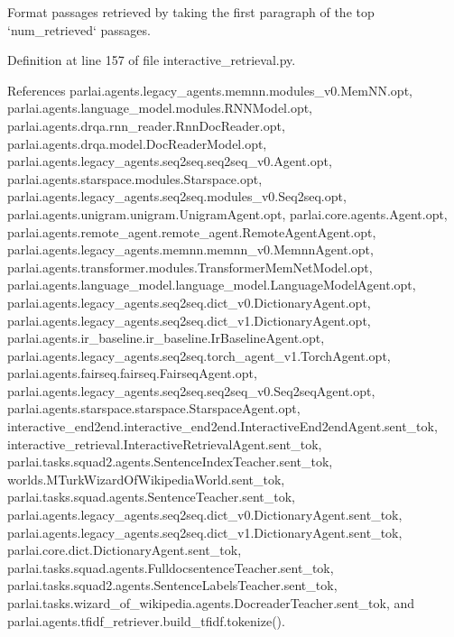 \begin{DoxyVerb}Format passages retrieved by taking the first paragraph of the
top `num_retrieved` passages.
\end{DoxyVerb}
 

Definition at line 157 of file interactive\+\_\+retrieval.\+py.



References parlai.\+agents.\+legacy\+\_\+agents.\+memnn.\+modules\+\_\+v0.\+Mem\+N\+N.\+opt, parlai.\+agents.\+language\+\_\+model.\+modules.\+R\+N\+N\+Model.\+opt, parlai.\+agents.\+drqa.\+rnn\+\_\+reader.\+Rnn\+Doc\+Reader.\+opt, parlai.\+agents.\+drqa.\+model.\+Doc\+Reader\+Model.\+opt, parlai.\+agents.\+legacy\+\_\+agents.\+seq2seq.\+seq2seq\+\_\+v0.\+Agent.\+opt, parlai.\+agents.\+starspace.\+modules.\+Starspace.\+opt, parlai.\+agents.\+legacy\+\_\+agents.\+seq2seq.\+modules\+\_\+v0.\+Seq2seq.\+opt, parlai.\+agents.\+unigram.\+unigram.\+Unigram\+Agent.\+opt, parlai.\+core.\+agents.\+Agent.\+opt, parlai.\+agents.\+remote\+\_\+agent.\+remote\+\_\+agent.\+Remote\+Agent\+Agent.\+opt, parlai.\+agents.\+legacy\+\_\+agents.\+memnn.\+memnn\+\_\+v0.\+Memnn\+Agent.\+opt, parlai.\+agents.\+transformer.\+modules.\+Transformer\+Mem\+Net\+Model.\+opt, parlai.\+agents.\+language\+\_\+model.\+language\+\_\+model.\+Language\+Model\+Agent.\+opt, parlai.\+agents.\+legacy\+\_\+agents.\+seq2seq.\+dict\+\_\+v0.\+Dictionary\+Agent.\+opt, parlai.\+agents.\+legacy\+\_\+agents.\+seq2seq.\+dict\+\_\+v1.\+Dictionary\+Agent.\+opt, parlai.\+agents.\+ir\+\_\+baseline.\+ir\+\_\+baseline.\+Ir\+Baseline\+Agent.\+opt, parlai.\+agents.\+legacy\+\_\+agents.\+seq2seq.\+torch\+\_\+agent\+\_\+v1.\+Torch\+Agent.\+opt, parlai.\+agents.\+fairseq.\+fairseq.\+Fairseq\+Agent.\+opt, parlai.\+agents.\+legacy\+\_\+agents.\+seq2seq.\+seq2seq\+\_\+v0.\+Seq2seq\+Agent.\+opt, parlai.\+agents.\+starspace.\+starspace.\+Starspace\+Agent.\+opt, interactive\+\_\+end2end.\+interactive\+\_\+end2end.\+Interactive\+End2end\+Agent.\+sent\+\_\+tok, interactive\+\_\+retrieval.\+Interactive\+Retrieval\+Agent.\+sent\+\_\+tok, parlai.\+tasks.\+squad2.\+agents.\+Sentence\+Index\+Teacher.\+sent\+\_\+tok, worlds.\+M\+Turk\+Wizard\+Of\+Wikipedia\+World.\+sent\+\_\+tok, parlai.\+tasks.\+squad.\+agents.\+Sentence\+Teacher.\+sent\+\_\+tok, parlai.\+agents.\+legacy\+\_\+agents.\+seq2seq.\+dict\+\_\+v0.\+Dictionary\+Agent.\+sent\+\_\+tok, parlai.\+agents.\+legacy\+\_\+agents.\+seq2seq.\+dict\+\_\+v1.\+Dictionary\+Agent.\+sent\+\_\+tok, parlai.\+core.\+dict.\+Dictionary\+Agent.\+sent\+\_\+tok, parlai.\+tasks.\+squad.\+agents.\+Fulldocsentence\+Teacher.\+sent\+\_\+tok, parlai.\+tasks.\+squad2.\+agents.\+Sentence\+Labels\+Teacher.\+sent\+\_\+tok, parlai.\+tasks.\+wizard\+\_\+of\+\_\+wikipedia.\+agents.\+Docreader\+Teacher.\+sent\+\_\+tok, and parlai.\+agents.\+tfidf\+\_\+retriever.\+build\+\_\+tfidf.\+tokenize().



